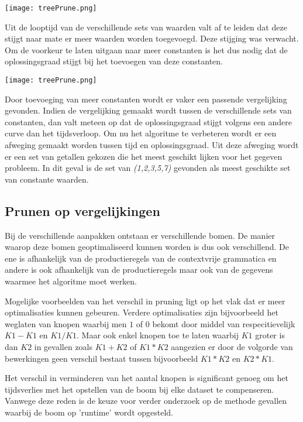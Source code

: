 \documentclass[Main.tex]{subfiles}
\begin{document}
\begin{center}
\texttt{[image: treePrune.png]} %
\end{center}

Uit de looptijd van de verschillende sets van waarden valt af te leiden dat deze stijgt naar mate er meer waarden worden toegevoegd. Deze stijging was verwacht. Om de voorkeur te laten uitgaan naar meer constanten is het dus nodig dat de oplossingsgraad stijgt bij het toevoegen van deze constanten. 

\begin{center}
\texttt{[image: treePrune.png]} 
\end{center}

Door toevoeging van meer constanten wordt er vaker een passende vergelijking gevonden. Indien de vergelijking gemaakt wordt tussen de verschillende sets van constanten, dan valt meteen op dat de oplossingsgraad stijgt volgens een andere curve dan het tijdsverloop. Om nu het algoritme te verbeteren wordt er een afweging gemaakt worden tussen tijd en oplossingsgraad. Uit deze afweging wordt er een set van getallen gekozen die het meest geschikt lijken voor het gegeven probleem. In dit geval is de set van \textit{(1,2,3,5,7)} gevonden als meest geschikte set van constante waarden. 

\subsection{Prunen op vergelijkingen}

Bij de verschillende aanpakken ontstaan er verschillende bomen. De manier waarop deze bomen geoptimaliseerd kunnen worden is dus ook verschillend. De ene is afhankelijk van de productieregels van de contextvrije grammatica en andere is ook afhankelijk van de productieregels maar ook van de gegevens waarmee het algoritme moet werken. 
\par 
Mogelijke voorbeelden van het verschil in pruning ligt op het vlak dat er meer optimalisaties kunnen gebeuren. Verdere optimalisaties zijn bijvoorbeeld het weglaten van knopen waarbij men $1$ of $0$ bekomt door middel van respecitievelijk $K1-K1$ en $K1/K1$. Maar ook enkel knopen toe te laten waarbij $K1$ groter is dan $K2$ in gevallen zoals $K1+K2$ of $K1*K2$ aangezien er door de volgorde van bewerkingen geen verschil bestaat tussen bijvoorbeeld $K1*K2$ en $K2*K1$.
\par 

Het verschil in verminderen van het aantal knopen is significant genoeg om het tijdsverlies met het opstellen van de boom bij elke dataset te compenseren. Vanwege deze reden is de keuze voor verder onderzoek op de methode gevallen waarbij de boom op 'runtime' wordt opgesteld. 
\end{document}
